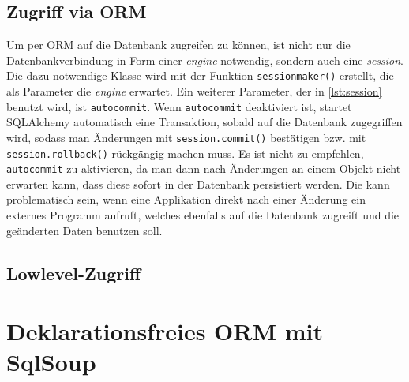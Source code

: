 

\subsection{Zugriff via ORM}

Um per ORM auf die Datenbank zugreifen zu können, ist nicht nur die
Datenbankverbindung in Form einer \emph{engine} notwendig, sondern auch eine
\emph{session}. Die dazu notwendige Klasse wird mit der Funktion
\texttt{sessionmaker()} erstellt, die als Parameter die \emph{engine} erwartet.
Ein weiterer Parameter, der in \autoref{lst:session} benutzt wird, ist
\texttt{autocommit}. Wenn \texttt{autocommit} deaktiviert ist, startet
SQLAlchemy automatisch eine Transaktion, sobald auf die Datenbank zugegriffen
wird, sodass man Änderungen mit \texttt{session.commit()} bestätigen bzw. mit
\texttt{session.rollback()} rückgängig machen muss. Es ist nicht zu empfehlen,
\texttt{autocommit} zu aktivieren, da man dann nach Änderungen an einem Objekt
nicht erwarten kann, dass diese sofort in der Datenbank persistiert werden.
Die kann problematisch sein, wenn eine Applikation direkt nach einer Änderung
ein externes Programm aufruft, welches ebenfalls auf die Datenbank zugreift
und die geänderten Daten benutzen soll.




\subsection{Lowlevel-Zugriff}

\section{Deklarationsfreies ORM mit SqlSoup}

